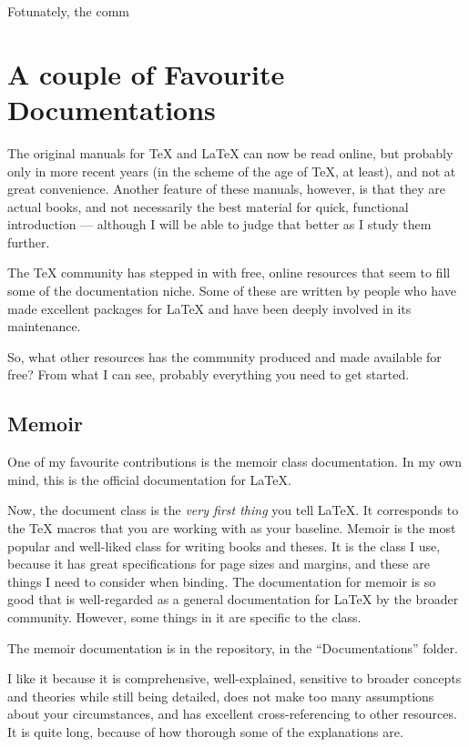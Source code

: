 \documentclass[11pt, oneside]{memoir}
\begin{document}
Fotunately, the comm

\section{A couple of Favourite Documentations}
The original manuals for TeX and LaTeX can now be read online, but probably only in more recent years (in the scheme of the age of TeX, at least), and not at great convenience. Another feature of these manuals, however, is that they are actual books, and not necessarily the best material for quick, functional introduction — although I will be able to judge that better as I study them further.

The TeX community has stepped in with free, online resources that seem to fill some of the documentation niche. Some of these are written by people who have made excellent packages for LaTeX and have been deeply involved in its maintenance.

So, what other resources has the community produced and made available for free? From what I can see, probably everything you need to get started.

\subsection{Memoir}

One of my favourite contributions is the memoir class documentation. In my own mind, this is the official documentation for LaTeX.

Now, the document class is the \emph{very first thing} you tell LaTeX. It corresponds to the TeX macros that you are working with as your baseline. Memoir is the most popular and well-liked class for writing books and theses. It is the class I use, because it has great specifications for page sizes and margins, and these are things I need to consider when binding. The documentation for memoir is so good that is well-regarded as a general documentation for LaTeX by the broader community. However, some things in it are specific to the class.

The memoir documentation is in the repository, in the  ``Documentations'' folder. 

I like it because it is comprehensive, well-explained, sensitive to broader concepts and theories while still being detailed, does not make too many assumptions about your circumstances, and has excellent cross-referencing to other resources. It is quite long, because of how thorough some of the explanations are.
\end{document}
